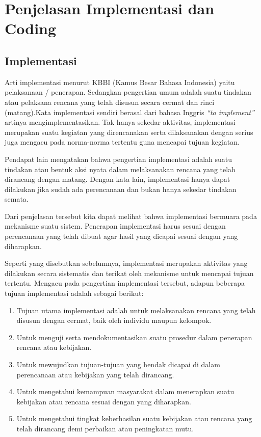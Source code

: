 \section{Penjelasan Implementasi dan Coding}
\subsection{Implementasi}
Arti implementasi menurut KBBI (Kamus Besar Bahasa Indonesia) yaitu pelaksanaan / penerapan. Sedangkan pengertian umum adalah suatu tindakan atau pelaksana rencana yang telah disusun secara cermat dan rinci (matang).Kata implementasi sendiri berasal dari bahasa Inggris \textit{“to implement”}  artinya mengimplementasikan. Tak hanya sekedar aktivitas, implementasi merupakan suatu kegiatan yang direncanakan serta dilaksanakan dengan serius juga mengacu pada norma-norma tertentu guna mencapai tujuan kegiatan.
\par Pendapat lain mengatakan bahwa pengertian implementasi adalah suatu tindakan atau bentuk aksi nyata dalam melaksanakan rencana yang telah dirancang dengan matang. Dengan kata lain, implementasi hanya dapat dilakukan jika sudah ada perencanaan dan bukan hanya sekedar tindakan semata.
\par Dari penjelasan tersebut kita dapat melihat bahwa implementasi bermuara pada mekanisme suatu sistem. Penerapan implementasi harus sesuai dengan perencanaan yang telah dibuat agar hasil yang dicapai sesuai dengan yang diharapkan.
\par Seperti yang disebutkan sebelumnya, implementasi merupakan aktivitas yang dilakukan secara sistematis dan terikat oleh mekanisme untuk mencapai tujuan tertentu. Mengacu pada pengertian implementasi tersebut, adapun beberapa tujuan implementasi adalah sebagai berikut:
\begin{enumerate}
    \item Tujuan utama implementasi adalah untuk melaksanakan rencana yang telah disusun dengan cermat, baik oleh individu maupun kelompok.
    \item Untuk menguji serta mendokumentasikan suatu prosedur dalam penerapan rencana atau kebijakan.
    \item Untuk mewujudkan tujuan-tujuan yang hendak dicapai di dalam perencanaan atau kebijakan yang telah dirancang.
    \item Untuk mengetahui kemampuan masyarakat dalam menerapkan suatu kebijakan atau rencana sesuai dengan yang diharapkan.
    \item Untuk mengetahui tingkat keberhasilan suatu kebijakan atau rencana yang telah dirancang demi perbaikan atau peningkatan mutu.

\end{enumerate}
